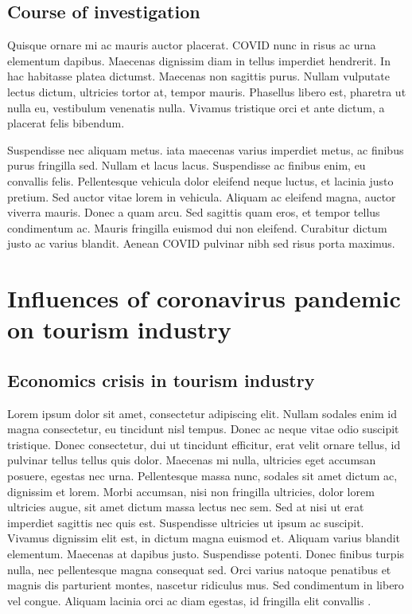 \documentclass[draft=false
              ,paper=a4
              ,twoside=false
              ,fontsize=12pt
              ,headsepline
              ,BCOR10mm
              ,DIV11
              ]{scrbook}
\begin{document}
\vspace{12pt}
\section{Course of investigation}
\vspace{6pt}

Quisque ornare mi ac mauris auctor placerat. \gls{COVID} nunc in risus ac urna elementum dapibus. Maecenas dignissim diam in tellus imperdiet hendrerit. In hac habitasse platea dictumst. Maecenas non sagittis purus. Nullam vulputate lectus dictum, ultricies tortor at, tempor mauris. Phasellus libero est, pharetra ut nulla eu, vestibulum venenatis nulla. Vivamus tristique orci et ante dictum, a placerat felis bibendum.

Suspendisse nec aliquam metus. \gls{iata} maecenas varius imperdiet metus, ac finibus purus fringilla sed. Nullam et lacus lacus. Suspendisse ac finibus enim, eu convallis felis. Pellentesque vehicula dolor eleifend neque luctus, et lacinia justo pretium. Sed auctor vitae lorem in vehicula. Aliquam ac eleifend magna, auctor viverra mauris. Donec a quam arcu. Sed sagittis quam eros, et tempor tellus condimentum ac. Mauris fringilla euismod dui non eleifend. Curabitur dictum justo ac varius blandit. Aenean \gls{COVID} pulvinar nibh sed risus porta maximus.

\vspace{12pt}
\chapter{Influences of coronavirus pandemic on tourism industry}
\vspace{6pt}
\section{Economics crisis in tourism industry}
\vspace{6pt}

Lorem ipsum dolor sit amet, consectetur adipiscing elit. Nullam sodales enim id magna consectetur, eu tincidunt nisl tempus. Donec ac neque vitae odio suscipit tristique. Donec consectetur, dui ut tincidunt efficitur, erat velit ornare tellus, id pulvinar tellus tellus quis dolor. Maecenas mi nulla, ultricies eget accumsan posuere, egestas nec urna. Pellentesque massa nunc, sodales sit amet dictum ac, dignissim et lorem. Morbi accumsan, nisi non fringilla ultricies, dolor lorem ultricies augue, sit amet dictum massa lectus nec sem. Sed at nisi ut erat imperdiet sagittis nec quis est. Suspendisse ultricies ut ipsum ac suscipit. Vivamus dignissim elit est, in dictum magna euismod et. Aliquam varius blandit elementum. Maecenas at dapibus justo. Suspendisse potenti. Donec finibus turpis nulla, nec pellentesque magna consequat sed. Orci varius natoque penatibus et magnis dis parturient montes, nascetur ridiculus mus. Sed condimentum in libero vel congue. Aliquam lacinia orci ac diam egestas, id fringilla elit convallis \cite{lorem}.
\end{document}
